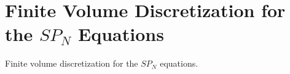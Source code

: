 \chapter{Finite Volume Discretization for the $SP_N$ Equations}
\label{chap:spn_spatial_discretization}
Finite volume discretization for the $SP_N$ equations.

